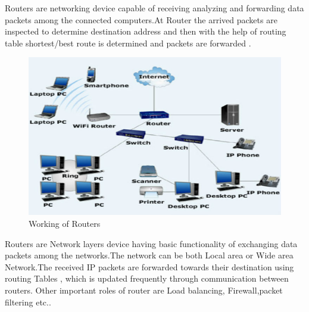 \documentclass[12pt]{article}
\begin{document}
\begin{A}
      {
            Routers are networking device capable of receiving analyzing and forwarding data packets among the connected computers.At Router the arrived packets are inspected to determine destination address and then with the help of routing table shortest/best route is determined and packets are forwarded .
            \begin{figure}[H]
                  \centering
                  \includegraphics[scale=0.4,cframe=blue 0.5pt 3pt]{Working of Router.jpg}
                  \caption{Working of Routers}
            \end{figure}
            Routers are Network layers device having basic functionality of exchanging data packets among the networks.The network can be both  Local area or Wide area Network.The received IP packets are forwarded towards their destination using routing Tables , which is updated frequently through communication between routers. Other important roles of router are Load balancing, Firewall,packet filtering etc..
      }
\end{A}


\end{document}
